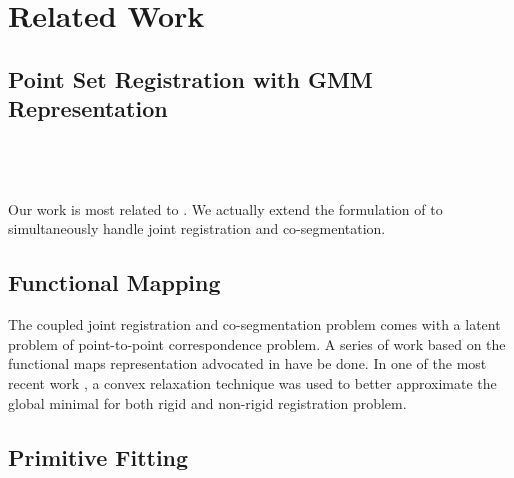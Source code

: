 \section{Related Work}
\label{sec:rw}
\subsection{Point Set Registration with GMM Representation}
\cite{TPS_RPM}\\
\cite{CPD}\\
\cite{GMM_PAMI}\\
Our work is most related to \cite{Evangelidis2014}. We actually extend the formulation of \cite{Evangelidis2014} to simultaneously handle joint registration and co-segmentation.
\subsection{Functional Mapping}
The coupled joint registration and co-segmentation problem comes with a latent problem of point-to-point correspondence problem. A series of work based on the functional maps representation advocated in \cite{Ovsjanikov:2012:FMF:2185520.2185526} have be done. In one of the most recent work \cite{Maron:2016:ConvRelax}, a convex relaxation technique was used to better approximate the global minimal for both rigid and non-rigid registration problem. 

\subsection{Primitive Fitting} 
\cite{GlobFit2011} 
